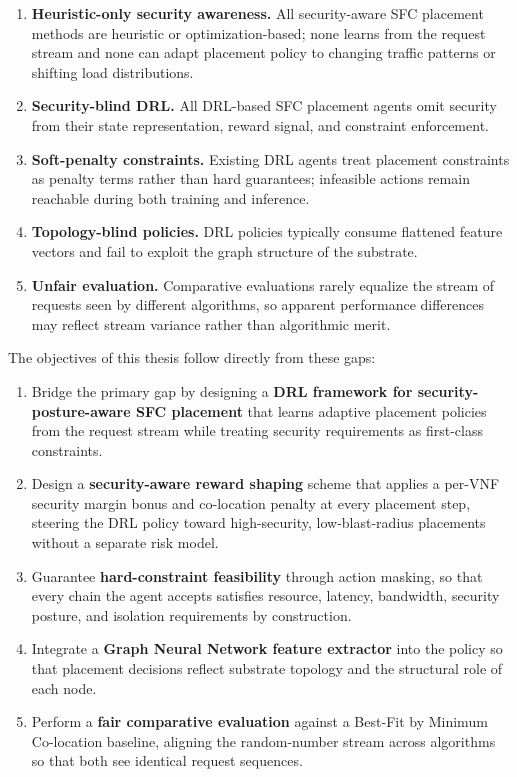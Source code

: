 \begin{enumerate}
  \item \textbf{Heuristic-only security awareness.} All
  security-aware SFC placement methods are heuristic or
  optimization-based; none learns from the request stream and none
  can adapt placement policy to changing traffic patterns or shifting
  load distributions.
  \item \textbf{Security-blind DRL.} All DRL-based SFC placement
  agents omit security from their state representation, reward
  signal, and constraint enforcement.
  \item \textbf{Soft-penalty constraints.} Existing DRL agents treat
  placement constraints as penalty terms rather than hard guarantees;
  infeasible actions remain reachable during both training and
  inference.
  \item \textbf{Topology-blind policies.} DRL policies typically
  consume flattened feature vectors and fail to exploit the graph
  structure of the substrate.
  \item \textbf{Unfair evaluation.} Comparative evaluations rarely
  equalize the stream of requests seen by different algorithms, so
  apparent performance differences may reflect stream variance rather
  than algorithmic merit.
\end{enumerate}

The objectives of this thesis follow directly from these gaps:

\begin{enumerate}
  \item Bridge the primary gap by designing a \textbf{DRL framework
  for security-posture-aware SFC placement} that learns adaptive
  placement policies from the request stream while treating security
  requirements as first-class constraints.
  \item Design a \textbf{security-aware reward shaping} scheme that
  applies a per-VNF security margin bonus and co-location penalty at
  every placement step, steering the DRL policy toward high-security,
  low-blast-radius placements without a separate risk model.
  \item Guarantee \textbf{hard-constraint feasibility} through action
  masking, so that every chain the agent accepts satisfies resource,
  latency, bandwidth, security posture, and isolation requirements by
  construction.
  \item Integrate a \textbf{Graph Neural Network feature extractor}
  into the policy so that placement decisions reflect substrate
  topology and the structural role of each node.
  \item Perform a \textbf{fair comparative evaluation} against a
  Best-Fit by Minimum Co-location baseline, aligning the random-number
  stream across algorithms so that both see identical request
  sequences.
\end{enumerate}

